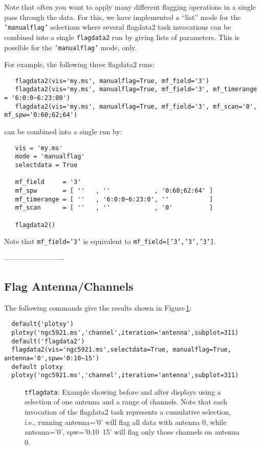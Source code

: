 Note that often you want to apply many different flagging operations
in a single pass through the data.  For this, we have implemented
a ``list'' mode for the {\tt 'manualflag'} selections where
several flagdata2 task invocations can be combined into a single
{\tt flagdata2} run by giving lists of parameters. 
This is possible for the {\tt 'manualflag'} mode, only.
    
For example, the following three flagdata2 runs:
\small
\begin{verbatim}
   flagdata2(vis='my.ms', manualflag=True, mf_field='3')
   flagdata2(vis='my.ms', manualflag=True, mf_field='3', mf_timerange = '6:0:0~6:23:00')
   flagdata2(vis='my.ms', manualflag=True, mf_field='3', mf_scan='0', mf_spw='0:60;62;64')
\end{verbatim}
\normalsize
can be combined into a single run by:
\small
\begin{verbatim}
   vis = 'my.ms'
   mode = 'manualflag'
   selectdata = True
   
   mf_field     = '3'
   mf_spw       = [ ''   , ''            , '0:60;62:64' ]
   mf_timerange = [ ''   , '6:0:0~6:23:0', ''           ]
   mf_scan      = [ ''   , ''            , '0'          ]
   
   flagdata2()
\end{verbatim}
\normalsize
Note that {\tt mf\_field='3'} is equivalent to {\tt mf\_field=['3','3','3']}.

-------------------------
\subsection{Flag Antenna/Channels}
\label{section:edit.flagdata.ant}

The following commands give the results shown in 
Figure\,\ref{fig:flagdata_antchan}:
\small
\begin{verbatim}
  default{'plotxy')
  plotxy('ngc5921.ms','channel',iteration='antenna',subplot=311)
  default('flagdata2')
  flagdata2(vis='ngc5921.ms',selectdata=True, manualflag=True, antenna='0',spw='0:10~15')
  default plotxy
  plotxy('ngc5921.ms','channel',iteration='antenna',subplot=311)
\end{verbatim}
\normalsize

\begin{figure}[h!]
\begin{center}
\caption{\label{fig:flagdata_antchan} {\tt tflagdata}: Example showing before
  and after displays using a selection of one antenna and a range of
  channels. Note that each invocation of the flagdata2 task represents
  a cumulative selection, i.e., running antenna='0' will flag all
  data with antenna 0, while antenna='0', spw='0:10~15'
  will flag only those channels on antenna 0. }
\hrulefill
\end{center}
\end{figure}


